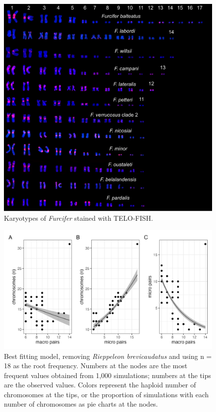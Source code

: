\documentclass[a4paper, 12pt]{article}
\begin{document}
\newpage
\begin{figure}[h]
 \centering
  \includegraphics[width = \linewidth]{figures/marcello-s6.jpg}
  \caption{Karyotypes of \textit{Furcifer} stained with TELO-FISH.
}
  \label{fig-s6}
\end{figure}

\newpage
\begin{figure}[h]
 \centering
  \includegraphics[width = \linewidth]{figures/micro-macro-chromosomes.png}
  \caption{Best fitting model, removing \textit{Rieppeleon brevicaudatus} and using n = 18 as the root frequency. Numbers at the nodes are the most frequent values obtained from 1,000 simulations; numbers at the tips are the observed values. Colors represent the haploid number of chromosomes at the tips, or the proportion of simulations with each number of chromosomes as pie charts at the nodes.
}
  \label{fig-best}
\end{figure}
\end{document}
